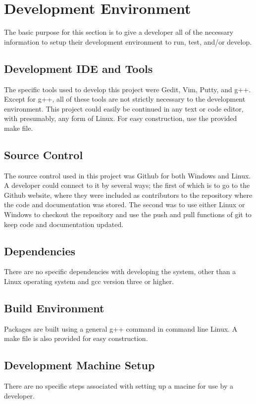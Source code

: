 \chapter{Development Environment}
The basic purpose for this section is to give a developer all of the necessary 
information to setup their development environment to run, test, and/or develop. 


\section{Development IDE and Tools}
The specific tools used to develop this project were Gedit, Vim, Putty, and g++. Except 
for g++, all of these tools are not strictly necessary to the development environment. This project 
could easily be continued in any text or code editor, with presumably, any form of Linux.  For easy construction, use the provided make file.

\section{Source  Control}
The source control used in this project was Github for both Windows and Linux. A developer could connect 
to it by several ways; the first of which is to go to the Github website, where they were included as 
contributors to the repository where the code and documentation was stored. The second was to use either 
Linux or Windows to checkout the repository and use the push and pull functions of git to keep code and 
documentation updated.

\section{Dependencies}
There are no specific dependencies with developing the system, other than a Linux operating system and gcc version three or higher.

\section{Build  Environment}
Packages are built using a general g++ command in command line Linux. A make file is also provided for easy construction.

\section{Development Machine Setup}
There are no specific steps associated with setting up a macine for use by a developer.


